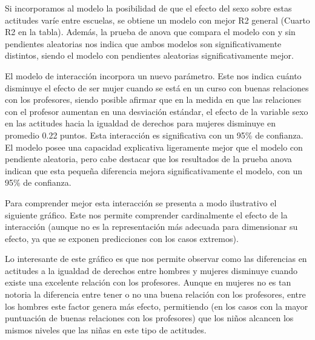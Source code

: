 \documentclass[12pt,twoside]{templates/facsothesis}
\begin{document}
Si incorporamos al modelo la posibilidad de que el efecto del sexo sobre estas actitudes varíe entre escuelas, se obtiene un modelo con mejor R2 general (Cuarto R2 en la tabla). Además, la prueba de anova que compara el modelo con y sin pendientes aleatorias nos indica que ambos modelos son significativamente distintos, siendo el modelo con pendientes aleatorias significativamente mejor.

El modelo de interacción incorpora un nuevo parámetro. Este nos indica cuánto disminuye el efecto de ser mujer cuando se está en un curso con buenas relaciones con los profesores, siendo posible afirmar que en la medida en que las relaciones con el profesor aumentan en una desviación estándar, el efecto de la variable sexo en las actitudes hacia la igualdad de derechos para mujeres disminuye en promedio 0.22 puntos. Esta interacción es significativa con un 95\% de confianza. El modelo posee una capacidad explicativa ligeramente mejor que el modelo con pendiente aleatoria, pero cabe destacar que los resultados de la prueba anova indican que esta pequeña diferencia mejora significativamente el modelo, con un 95\% de confianza.

Para comprender mejor esta interacción se presenta a modo ilustrativo el siguiente gráfico. Este nos permite comprender cardinalmente el efecto de la interacción (aunque no es la representación más adecuada para dimensionar su efecto, ya que se exponen predicciones con los casos extremos).

Lo interesante de este gráfico es que nos permite observar como las diferencias en actitudes a la igualdad de derechos entre hombres y mujeres disminuye cuando existe una excelente relación con los profesores. Aunque en mujeres no es tan notoria la diferencia entre tener o no una buena relación con los profesores, entre los hombres este factor genera más efecto, permitiendo (en los casos con la mayor puntuación de buenas relaciones con los profesores) que los niños alcancen los mismos niveles que las niñas en este tipo de actitudes.
\end{document}
